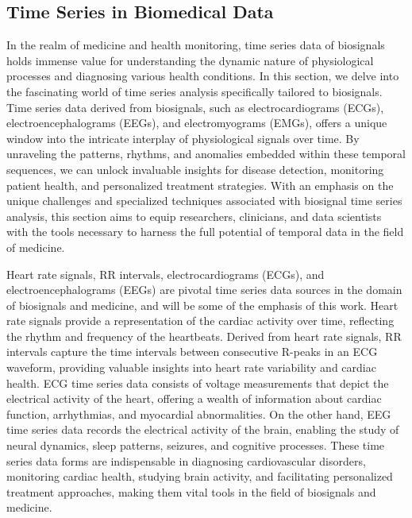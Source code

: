 \documentclass[../main.tex]{subfiles}
\begin{document}
    \subsection{Time Series in Biomedical Data}
    
        In the realm of medicine and health monitoring, time series data of biosignals holds immense value for understanding the dynamic nature of physiological processes and diagnosing various health conditions. In this section, we delve into the fascinating world of time series analysis specifically tailored to biosignals. Time series data derived from biosignals, such as electrocardiograms (ECGs), electroencephalograms (EEGs), and electromyograms (EMGs), offers a unique window into the intricate interplay of physiological signals over time. By unraveling the patterns, rhythms, and anomalies embedded within these temporal sequences, we can unlock invaluable insights for disease detection, monitoring patient health, and personalized treatment strategies. With an emphasis on the unique challenges and specialized techniques associated with biosignal time series analysis, this section aims to equip researchers, clinicians, and data scientists with the tools necessary to harness the full potential of temporal data in the field of medicine. \par

        Heart rate signals, RR intervals, electrocardiograms (ECGs), and electroencephalograms (EEGs) are pivotal time series data sources in the domain of biosignals and medicine, and will be some of the emphasis of this work. Heart rate signals provide a representation of the cardiac activity over time, reflecting the rhythm and frequency of the heartbeats. Derived from heart rate signals, RR intervals capture the time intervals between consecutive R-peaks in an ECG waveform, providing valuable insights into heart rate variability and cardiac health. ECG time series data consists of voltage measurements that depict the electrical activity of the heart, offering a wealth of information about cardiac function, arrhythmias, and myocardial abnormalities. On the other hand, EEG time series data records the electrical activity of the brain, enabling the study of neural dynamics, sleep patterns, seizures, and cognitive processes. These time series data forms are indispensable in diagnosing cardiovascular disorders, monitoring cardiac health, studying brain activity, and facilitating personalized treatment approaches, making them vital tools in the field of biosignals and medicine.\par
\end{document}
